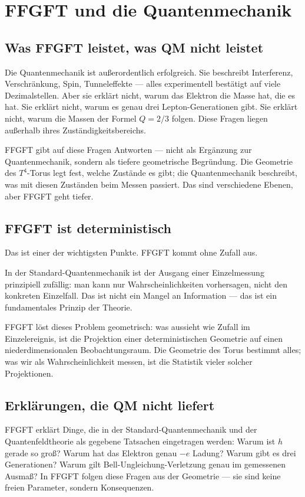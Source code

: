 \documentclass[12pt,oneside]{book}
\begin{document}
\chapter{FFGFT und die Quantenmechanik}

\section{Was FFGFT leistet, was QM nicht leistet}

Die Quantenmechanik ist außerordentlich erfolgreich. Sie beschreibt Interferenz, Verschränkung, Spin, Tunneleffekte — alles experimentell bestätigt auf viele Dezimalstellen. Aber sie erklärt nicht, warum das Elektron die Masse hat, die es hat. Sie erklärt nicht, warum es genau drei Lepton-Generationen gibt. Sie erklärt nicht, warum die Massen der Formel $Q = 2/3$ folgen. Diese Fragen liegen außerhalb ihres Zuständigkeitsbereichs.

FFGFT gibt auf diese Fragen Antworten — nicht als Ergänzung zur Quantenmechanik, sondern als tiefere geometrische Begründung. Die Geometrie des $T^4$-Torus legt fest, welche Zustände es gibt; die Quantenmechanik beschreibt, was mit diesen Zuständen beim Messen passiert. Das sind verschiedene Ebenen, aber FFGFT geht tiefer.

\section{FFGFT ist deterministisch}

Das ist einer der wichtigsten Punkte. FFGFT kommt ohne Zufall aus.

In der Standard-Quantenmechanik ist der Ausgang einer Einzelmessung prinzipiell zufällig: man kann nur Wahrscheinlichkeiten vorhersagen, nicht den konkreten Einzelfall. Das ist nicht ein Mangel an Information — das ist ein fundamentales Prinzip der Theorie.

FFGFT löst dieses Problem geometrisch: was aussieht wie Zufall im Einzelereignis, ist die Projektion einer deterministischen Geometrie auf einen niederdimensionalen Beobachtungsraum. Die Geometrie des Torus bestimmt alles; was wir als Wahrscheinlichkeit messen, ist die Statistik vieler solcher Projektionen.

\section{Erklärungen, die QM nicht liefert}

FFGFT erklärt Dinge, die in der Standard-Quantenmechanik und der Quantenfeldtheorie als gegebene Tatsachen eingetragen werden: Warum ist $h$ gerade so groß? Warum hat das Elektron genau $-e$ Ladung? Warum gibt es drei Generationen? Warum gilt Bell-Ungleichung-Verletzung genau im gemessenen Ausmaß? In FFGFT folgen diese Fragen aus der Geometrie — sie sind keine freien Parameter, sondern Konsequenzen.
\end{document}
